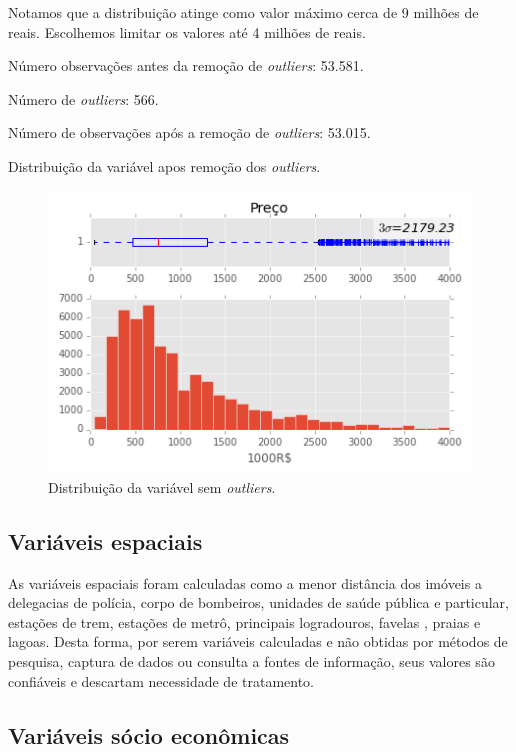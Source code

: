   Notamos que a distribuição atinge como valor máximo cerca de 9 milhões de reais. Escolhemos limitar os valores até 4 milhões de reais.
  
  
  Número observações antes da remoção de \textit{outliers}: 53.581. 
  
  Número de \textit{outliers}: 566.
  
  Número de observações após a remoção de \textit{outliers}: 53.015.
  
  Distribuição da variável  apos remoção dos \textit{outliers}.
  
  \begin{figure}[H]
  	\centering
  	\includegraphics[width=0.8\linewidth]{img/var_preco_boxhist_depois}
  	\caption{Distribuição da variável  sem \textit{outliers}.}
  	\label{fig:var_preco_boxhist_depois}
  \end{figure}
  
  
\subsection{Variáveis espaciais}

As variáveis espaciais foram calculadas como a menor distância dos imóveis a delegacias de polícia, corpo de bombeiros, unidades de saúde pública e particular, estações de trem, estações de metrô, principais logradouros, favelas	, praias e lagoas. Desta forma, por serem variáveis calculadas e não obtidas por métodos de pesquisa, captura de dados ou consulta a fontes de informação, seus valores são confiáveis e descartam necessidade de tratamento.

\subsection{Variáveis sócio econômicas}

